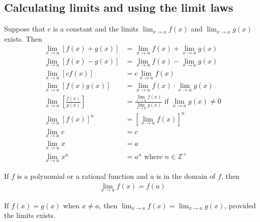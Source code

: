 \documentclass{article}
\begin{document}
\subsection{Calculating limits and using the limit laws}
\begin{theorem}
    Suppose that $c$ is a constant and the limits $\lim_{x\to a}f(x)$ and $\lim_{x\to a}g(x)$ exists. Then
    \begin{align*}
        \lim_{x\to a}\left[f(x)+g(x)\right]
                          & =\lim_{x\to a}f(x)+\lim_{x\to a}g(x)                                              \\
        \lim_{x\to a}\left[f(x)-g(x)\right]
                          & =\lim_{x\to a}f(x)-\lim_{x\to a}g(x)                                              \\
        \lim_{x\to a}\left[cf(x)\right]
                          & =c\lim_{x\to a}f(x)                                                               \\
        \lim_{x\to a}\left[f(x)g(x)\right]
                          & =\lim_{x\to a}f(x)\cdot\lim_{x\to a}g(x)                                          \\
        \lim_{x\to a}\left[\frac{f(x)}{g(x)}\right]
                          & =\frac{\lim_{x\to a}f(x)}{\lim_{x\to a}g(x)}\text{ if } \lim_{x\to a}g(x)\not = 0 \\
        \lim_{x\to a}\left[f(x)\right]^n
                          & =\left[\lim_{x\to a}f(x)\right]^n                                                 \\
        \lim_{x\to a}c    & = c                                                                               \\
        \lim_{x \to a}x   & = a                                                                               \\
        \lim_{x \to a}x^n & = a^n \text{ where } n\in\mathbb{Z}^+
    \end{align*}
\end{theorem}
\begin{theorem}
    If $f$ is a polynomial or a rational function and $a$ is in the domain of $f$, then
    \begin{align*}
        \lim_{x\to a}f(x) = f(a)
    \end{align*}
\end{theorem}
\begin{theorem}
    If $f(x) = g(x)$ when $x\not=a$, then $\lim_{x\to a}f(x) = \lim_{x\to a}g(x)$, provided the limits exists.
\end{theorem}
\end{document}

